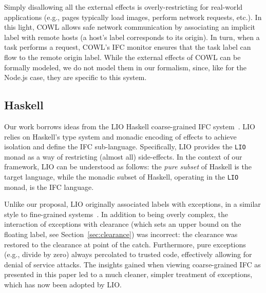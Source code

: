Simply disallowing all the external effects is overly-restricting for
real-world applications (e.g., pages typically load images, perform
network requests, etc.).
%
In this light, COWL allows safe network communication by associating an
implicit label with remote hosts (a host's label corresponds to
its origin).
%
In turn, when a task performs a request, COWL's IFC monitor
ensures that the task label can flow to the remote origin label.
%
While the external effects of COWL can be formally modeled, we do not
model them in our formalism, %
since, like for the
Node.js case, they are specific to this system.
%



\subsection{Haskell}
\label{sec:real:hs}
Our work borrows ideas from the LIO Haskell coarse-grained IFC
system~\cite{lio, stefan:addressing-covert}.
%
LIO relies on Haskell's type system and monadic encoding of
effects to achieve isolation and define the IFC sub-language.
%
Specifically, LIO provides the \verb|LIO| monad as a way of restricting
(almost all) side-effects.
%
In the context of our framework, LIO can be understood as follows: the
\emph{pure subset} of Haskell is the target language, while the
monadic subset of Haskell, operating in the \verb|LIO| monad, is the
IFC language.

%
Unlike our proposal, LIO originally associated labels with exceptions, in a
similar style to fine-grained
systems~\cite{stefan:2012:arxiv-flexible, Hritcu:2013:YIB:2497621.2498098}.
%
In addition to being overly complex, the interaction of exceptions
with clearance (which sets an upper bound on the floating label, see
Section~\ref{sec:clearance}) was incorrect: the clearance
was restored to the clearance at point of the catch.
%
Furthermore, pure exceptions (e.g., divide by zero) always percolated to
trusted code, effectively allowing for denial of service attacks.
%
The insights gained when viewing coarse-grained IFC as presented in this
paper led to a much cleaner, simpler treatment of exceptions,
which has now been adopted by LIO.






